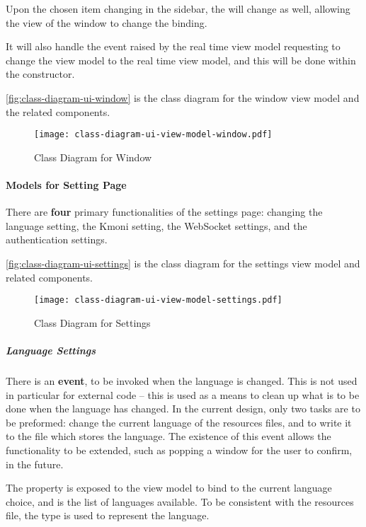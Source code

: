 Upon the chosen item changing in the sidebar, the  will change as well, allowing the view of the window to change the binding.

It will also handle the event raised by the real time view model requesting to change the view model to the real time view model, and this will be done within the constructor.

\autoref{fig:class-diagram-ui-window} is the class diagram for the window view model and the related components.

\begin{figure}[htp]
    \centering
    \texttt{[image: class-diagram-ui-view-model-window.pdf]}
    \caption{Class Diagram for Window}
    \label{fig:class-diagram-ui-window}
\end{figure}

\paragraph{Models for Setting Page}

There are \textbf{four} primary functionalities of the settings page: changing the language setting, the Kmoni setting, the WebSocket settings, and the authentication settings.

\autoref{fig:class-diagram-ui-settings} is the class diagram for the settings view model and related components.

\begin{figure}[htp]
    \centering
    \texttt{[image: class-diagram-ui-view-model-settings.pdf]}
    \caption{Class Diagram for Settings}
    \label{fig:class-diagram-ui-settings}
\end{figure}

\subparagraph{Language Settings}

There is an \textbf{event},  to be invoked when the language is changed. This is not used in particular for external code -- this is used as a means to clean up what is to be done when the language has changed. In the current design, only two tasks are to be preformed: change the current language of the resources files, and to write it to the file which stores the language. The existence of this event allows the functionality to be extended, such as popping a window for the user to confirm, in the future.

The property  is exposed to the view model to bind to the current language choice, and  is the list of languages available. To be consistent with the resources file, the type  is used to represent the language.

